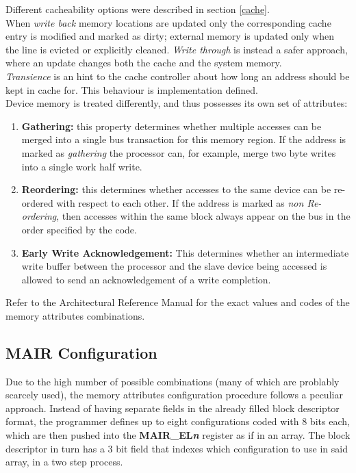 \documentclass[12pt,a4paper,openright,twoside]{report}
\begin{document}
Different cacheability options were described in section \ref{cache}.\\
When \textit{write back} memory locations are updated only the corresponding cache entry
is modified and marked as dirty; external memory is updated only when the 
line is evicted or explicitly cleaned.
\textit{Write through} is instead a safer approach, where an update changes both the cache
and the system memory.\\
\textit{Transience} is an hint to the cache controller about how long an address should be 
kept in cache for. This behaviour is implementation defined.\\

Device memory is treated differently, and thus possesses its own set of attributes:
\begin{enumerate}
    \item \textbf{Gathering:} this property determines whether multiple accesses
        can be merged into a single bus transaction for this memory region. If 
        the address is marked as \textit{gathering} the processor can, for example, 
        merge two byte writes into a single work half write.
    \item \textbf{Reordering:} this determines whether accesses to the same 
        device can be re-ordered with respect to each other. If the address is 
        marked as \textit{non Re-ordering}, then accesses within the same block 
        always appear on the bus in the order specified by the code.
    \item \textbf{Early Write Acknowledgement:} This determines whether an 
        intermediate write buffer between the processor and
        the slave device being accessed is allowed to send an 
        acknowledgement of a write completion.
\end{enumerate}

Refer to the Architectural Reference Manual \cite{armarm} for the exact values
and codes of the memory attributes combinations.

\subsection{MAIR Configuration}
Due to the high number of possible combinations (many of which are problably 
scarcely used), the memory attributes 
configuration procedure follows a peculiar approach. Instead of having separate
fields in the already filled block descriptor format, the programmer defines
up to eight configurations coded with 8 bits each, which are then pushed into
the \textbf{MAIR\_EL\textit{n}} register as if in an array.
The block descriptor in turn has a 3 bit field that indexes which configuration
to use in said array, in a two step process.
\end{document}
